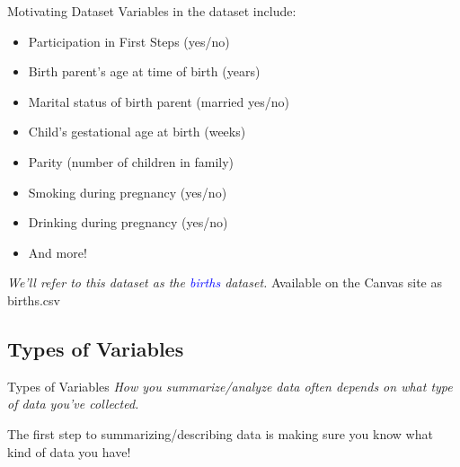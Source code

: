 \documentclass[10pt,t]{beamer}
\begin{document}
\begin{frame}{Motivating Dataset}
Variables in the dataset include:

\vspace{0.3cm}


\begin{itemize}
	\item Participation in First Steps (yes/no)
	\item Birth parent's age at time of birth (years)
	\item Marital status of birth parent (married yes/no)
	\item Child's gestational age at birth (weeks)
	\item Parity (number of children in family)
	\item Smoking during pregnancy (yes/no)
	\item Drinking during pregnancy (yes/no)
	\item And more!
\end{itemize}

\vspace{0.3cm} 

\textit{We'll refer to this dataset as the \textcolor{blue}{births} dataset.} Available on the Canvas site as \color{blue} births.csv
\end{frame}

\subsection{Types of Variables}

\begin{frame}{Types of Variables}
\textit{How you summarize/analyze data often depends on what type of data you've collected.}

\vspace{0.3cm}

The first step to summarizing/describing data is making sure you know what kind of data you have!

\end{frame}
\end{document}
